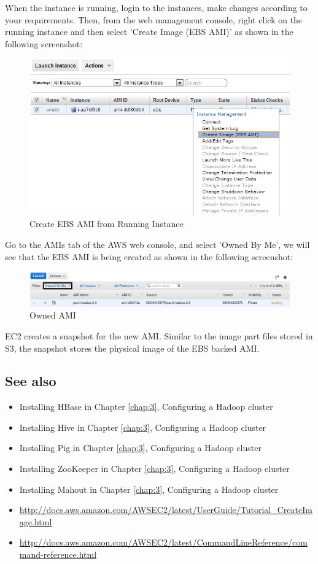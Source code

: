 When the instance is running, login to the instances, make changes according to your requirements. Then, from the web management console, right click on the running instance and then select 'Create Image (EBS AMI)' as shown in the following screenshot:
\begin{figure}[h]
  \centering
  \includegraphics[width=.8\textwidth]{figs/5163os_08_31.png}
  \caption{Create EBS AMI from Running Instance}\label{fig:aws.create.ebsami}
\end{figure} 

Go to the AMIs tab of the AWS web console, and select 'Owned By Me', we will see that the EBS AMI is being created as shown in the following screenshot:
\begin{figure}[h]
  \centering
  \includegraphics[width=.8\textwidth]{figs/5163os_08_33.png}
  \caption{Owned AMI}\label{fig:aws.owned.ami}
\end{figure} 

EC2 creates a snapshot for the new AMI. Similar to the image part files stored in S3, the snapshot stores the physical image of the EBS backed AMI.

\subsection*{See also}
\begin{itemize}
  \item Installing HBase in Chapter \ref{chap:3}, Configuring a Hadoop cluster
  \item Installing Hive in Chapter \ref{chap:3}, Configuring a Hadoop cluster
  \item Installing Pig in Chapter \ref{chap:3}, Configuring a Hadoop cluster
  \item Installing ZooKeeper in Chapter \ref{chap:3}, Configuring a Hadoop cluster
  \item Installing Mahout in Chapter \ref{chap:3}, Configuring a Hadoop cluster
  \item \url{http://docs.aws.amazon.com/AWSEC2/latest/UserGuide/Tutorial_CreateImage.html}
  \item \url{http://docs.aws.amazon.com/AWSEC2/latest/CommandLineReference/command-reference.html}
\end{itemize}

